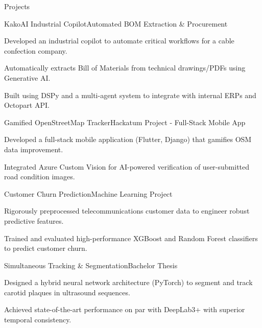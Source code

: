 \documentclass{resume} %
\begin{document}
\begin{rSection}{Projects}

\begin{rSubsection}{KakoAI Industrial Copilot}{}{Automated BOM Extraction \& Procurement}{}
\item Developed an industrial copilot to automate critical workflows for a cable confection company.
\item Automatically extracts Bill of Materials from technical drawings/PDFs using Generative AI.
\item Built using DSPy and a multi-agent system to integrate with internal ERPs and Octopart API.
\end{rSubsection}

\begin{rSubsection}{Gamified OpenStreetMap Tracker}{}{Hackatum Project - Full-Stack Mobile App}{}
\item Developed a full-stack mobile application (Flutter, Django) that gamifies OSM data improvement.
\item Integrated Azure Custom Vision for AI-powered verification of user-submitted road condition images.
\end{rSubsection}

\begin{rSubsection}{Customer Churn Prediction}{}{Machine Learning Project}{}
\item Rigorously preprocessed telecommunications customer data to engineer robust predictive features.
\item Trained and evaluated high-performance XGBoost and Random Forest classifiers to predict customer churn.
\end{rSubsection}

\begin{rSubsection}{Simultaneous Tracking \& Segmentation}{}{Bachelor Thesis}{}
\item Designed a hybrid neural network architecture (PyTorch) to segment and track carotid plaques in ultrasound sequences.
\item Achieved state-of-the-art performance on par with DeepLab3+ with superior temporal consistency.
\end{rSubsection}

\end{rSection}
\end{document}
